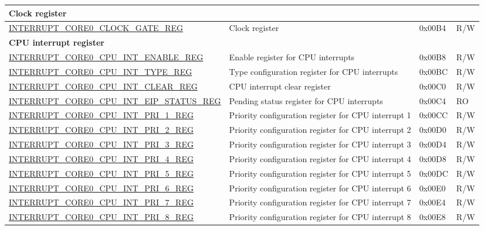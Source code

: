 \begin{longtable}{ | p{10cm} | m{10cm} | m{1.3cm} | m{1.0cm} | }
\multicolumn{4}{|l|}{\textbf{Clock register}} \\ \hline
\hyperref[regdesc:INTERRUPTCORE0CLOCKGATEREG]{INTERRUPT\_CORE0\_CLOCK\_GATE\_REG} & Clock register & 0x00B4 & R/W \\ \hline
\multicolumn{4}{|l|}{\textbf{CPU interrupt register}} \\ \hline
\hyperref[regdesc:INTERRUPTCORE0CPUINTENABLEREG]{INTERRUPT\_CORE0\_CPU\_INT\_ENABLE\_REG} & Enable register for CPU interrupts & 0x00B8 & R/W \\ \hline
\hyperref[regdesc:INTERRUPTCORE0CPUINTTYPEREG]{INTERRUPT\_CORE0\_CPU\_INT\_TYPE\_REG} & Type configuration register for CPU interrupts & 0x00BC & R/W \\ \hline
\hyperref[regdesc:INTERRUPTCORE0CPUINTCLEARREG]{INTERRUPT\_CORE0\_CPU\_INT\_CLEAR\_REG} & CPU interrupt clear register & 0x00C0 & R/W \\ \hline
\hyperref[regdesc:INTERRUPTCORE0CPUINTEIPSTATUSREG]{INTERRUPT\_CORE0\_CPU\_INT\_EIP\_STATUS\_REG} & Pending status register for CPU interrupts & 0x00C4 & RO \\ \hline
\hyperref[regdesc:INTERRUPTCORE0CPUINTPRI0REG]{INTERRUPT\_CORE0\_CPU\_INT\_PRI\_1\_REG} & Priority configuration register for CPU interrupt 1 & 0x00CC & R/W \\ \hline
\hyperref[regdesc:INTERRUPTCORE0CPUINTPRI0REG]{INTERRUPT\_CORE0\_CPU\_INT\_PRI\_2\_REG} & Priority configuration register for CPU interrupt 2 & 0x00D0 & R/W \\ \hline
\hyperref[regdesc:INTERRUPTCORE0CPUINTPRI0REG]{INTERRUPT\_CORE0\_CPU\_INT\_PRI\_3\_REG} & Priority configuration register for CPU interrupt 3 & 0x00D4 & R/W \\ \hline
\hyperref[regdesc:INTERRUPTCORE0CPUINTPRI0REG]{INTERRUPT\_CORE0\_CPU\_INT\_PRI\_4\_REG} & Priority configuration register for CPU interrupt 4 & 0x00D8 & R/W \\ \hline
\hyperref[regdesc:INTERRUPTCORE0CPUINTPRI0REG]{INTERRUPT\_CORE0\_CPU\_INT\_PRI\_5\_REG} & Priority configuration register for CPU interrupt 5 & 0x00DC & R/W \\ \hline
\hyperref[regdesc:INTERRUPTCORE0CPUINTPRI0REG]{INTERRUPT\_CORE0\_CPU\_INT\_PRI\_6\_REG} & Priority configuration register for CPU interrupt 6 & 0x00E0 & R/W \\ \hline
\hyperref[regdesc:INTERRUPTCORE0CPUINTPRI0REG]{INTERRUPT\_CORE0\_CPU\_INT\_PRI\_7\_REG} & Priority configuration register for CPU interrupt 7 & 0x00E4 & R/W \\ \hline
\hyperref[regdesc:INTERRUPTCORE0CPUINTPRI0REG]{INTERRUPT\_CORE0\_CPU\_INT\_PRI\_8\_REG} & Priority configuration register for CPU interrupt 8 & 0x00E8 & R/W \\ \hline

\end{longtable}
